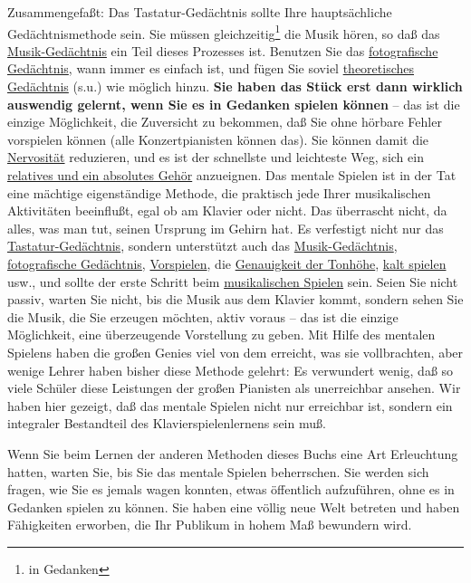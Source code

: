 Zusammengefaßt: Das Tastatur-Gedächtnis sollte Ihre hauptsächliche Gedächtnismethode sein.
Sie müssen gleichzeitig\footnote{in Gedanken} die Musik hören, so daß das \hyperref[c1iii6musik]{Musik-Gedächtnis} ein Teil dieses Prozesses ist.
Benutzen Sie das \hyperref[c1iii6foto]{fotografische Gedächtnis}, wann immer es einfach ist, und fügen Sie soviel \hyperref[c1iii6theorie]{theoretisches Gedächtnis} (s.u.) wie möglich hinzu.
\textbf{Sie haben das Stück erst dann wirklich auswendig gelernt, wenn Sie es in Gedanken spielen können} -- das ist die einzige Möglichkeit, die Zuversicht zu bekommen, daß Sie ohne hörbare Fehler vorspielen können (alle Konzertpianisten können das).
Sie können damit die \hyperref[c1iii15]{Nervosität} reduzieren, und es ist der schnellste und leichteste Weg, sich ein \hyperref[c1iii12]{relatives und ein absolutes Gehör} anzueignen.
Das mentale Spielen ist in der Tat eine mächtige eigenständige Methode, die praktisch jede Ihrer musikalischen Aktivitäten beeinflußt, egal ob am Klavier oder nicht.
Das überrascht nicht, da alles, was man tut, seinen Ursprung im Gehirn hat.
Es verfestigt nicht nur das \hyperref[c1iii6tastatur]{Tastatur-Gedächtnis}, sondern unterstützt auch das \hyperref[c1iii6musik]{Musik-Gedächtnis}, \hyperref[c1iii6foto]{fotografische Gedächtnis}, \hyperref[c1iii14]{Vorspielen}, die \hyperref[c1iii12]{Genauigkeit der Tonhöhe}, \hyperref[c1iii6g]{kalt spielen} usw., und sollte der erste Schritt beim \hyperref[c1iii14d]{musikalischen Spielen} sein.
Seien Sie nicht passiv, warten Sie nicht, bis die Musik aus dem Klavier kommt, sondern sehen Sie die Musik, die Sie erzeugen möchten, aktiv voraus -- das ist die einzige Möglichkeit, eine überzeugende Vorstellung zu geben.
Mit Hilfe des mentalen Spielens haben die großen Genies viel von dem erreicht, was sie vollbrachten, aber wenige Lehrer haben bisher diese Methode gelehrt: Es verwundert wenig, daß so viele Schüler diese Leistungen der großen Pianisten als unerreichbar ansehen.
Wir haben hier gezeigt, daß das mentale Spielen nicht nur erreichbar ist, sondern ein integraler Bestandteil des Klavierspielenlernens sein muß.

Wenn Sie beim Lernen der anderen Methoden dieses Buchs eine Art Erleuchtung hatten, warten Sie, bis Sie das mentale Spielen beherrschen.
Sie werden sich fragen, wie Sie es jemals wagen konnten, etwas öffentlich aufzuführen, ohne es in Gedanken spielen zu können.
Sie haben eine völlig neue Welt betreten und haben Fähigkeiten erworben, die Ihr Publikum in hohem Maß bewundern wird.


